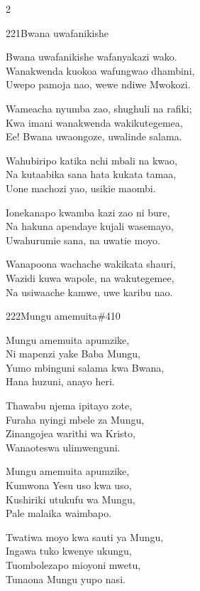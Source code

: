\begin{multicols}{2}
\begin{hymn}{221}{Bwana uwafanikishe}{}
\begin{stanza}
Bwana uwafanikishe wafanyakazi wako.\\
Wanakwenda kuokoa wafungwao dhambini,\\
Uwepo pamoja nao, wewe ndiwe Mwokozi.
\end{stanza}
\begin{stanza}
Wameacha nyumba zao, shughuli na rafiki;\\
Kwa imani wanakwenda wakikutegemea,\\
Ee! Bwana uwaongoze, uwalinde salama.
\end{stanza}
\begin{stanza}
Wahubiripo katika nchi mbali na kwao,\\
Na kutaabika sana hata kukata tamaa,\\
Uone machozi yao, usikie maombi.
\end{stanza}
\begin{stanza}
Ionekanapo kwamba kazi zao ni bure,\\
Na hakuna apendaye kujali wasemayo,\\
Uwahurumie sana, na uwatie moyo.
\end{stanza}
\begin{stanza}
Wanapoona wachache wakikata shauri,\\
Wazidi kuwa wapole, na wakutegemee,\\
Na usiwaache kamwe, uwe karibu nao.
\end{stanza}
\end{hymn}

\begin{hymn}{222}{Mungu amemuita}{\#410}
\begin{stanza}
Mungu amemuita apumzike,\\
Ni mapenzi yake Baba Mungu,\\
Yumo mbinguni salama kwa Bwana,\\
Hana huzuni, anayo heri.
\end{stanza}
\begin{stanza}
Thawabu njema ipitayo zote,\\
Furaha nyingi mbele za Mungu,\\
Zinangojea warithi wa Kristo,\\
Wanaoteswa ulimwenguni.
\end{stanza}
\begin{stanza}
Mungu amemuita apumzike,\\
Kumwona Yesu uso kwa uso,\\
Kushiriki utukufu wa Mungu,\\
Pale malaika waimbapo.
\end{stanza}
\begin{stanza}
Twatiwa moyo kwa sauti ya Mungu,\\
Ingawa tuko kwenye ukungu,\\
Tuombolezapo mioyoni mwetu,\\
Tunaona Mungu yupo nasi.
\end{stanza}
\end{hymn}


\end{multicols}
